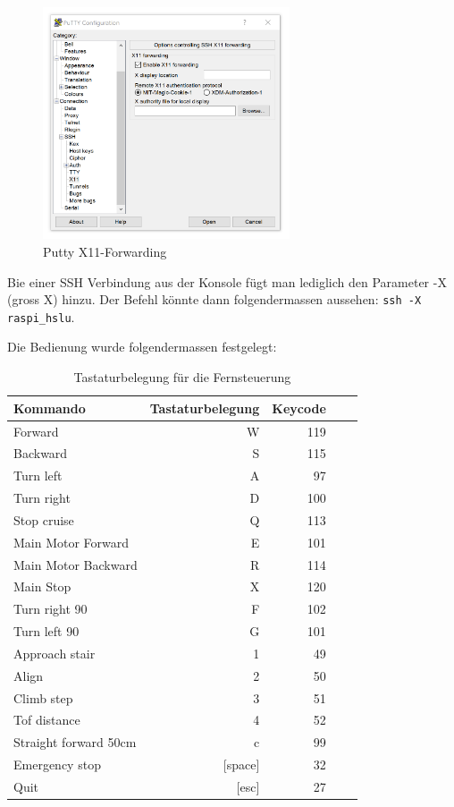 \begin{figure}[H]
  \includegraphics[width=0.65\textwidth]{img/remote_control/putty_x11.PNG}
  \centering
  \caption{Putty X11-Forwarding}
  \label{fig:putty_x11_forwarding}
\end{figure}

Bie einer SSH Verbindung aus der Konsole fügt man lediglich den Parameter -X (gross X) hinzu. Der Befehl könnte dann folgendermassen aussehen: \texttt{ssh -X raspi\_hslu}.

Die Bedienung wurde folgendermassen festgelegt:
\begin{center}
\begin{table}[H]
\begin{tabular}{|l|r|r|r|r|}
\hline
\textbf{Kommando} & \textbf{Tastaturbelegung} &
\textbf{Keycode}\\
\hline
Forward & W & 119\\
\hline
Backward & S & 115\\
\hline
Turn left & A & 97\\
\hline
Turn right & D & 100\\
\hline
Stop cruise & Q & 113\\
\hline
Main Motor Forward & E & 101\\ 
\hline
Main Motor Backward & R & 114\\ 
\hline
Main Stop & X & 120\\ 
\hline
Turn right 90 & F & 102\\ 
\hline
Turn left 90 & G & 101\\ 
\hline
Approach stair & 1 & 49\\ 
\hline
Align & 2 & 50\\ 
\hline
Climb step & 3 & 51\\ 
\hline
Tof distance & 4 & 52\\ 
\hline
Straight forward 50cm & c & 99\\ 
\hline
Emergency stop & [space] & 32\\ 
\hline
Quit & [esc] & 27\\ 
\hline
\end{tabular}
\caption[Tastaturbelegung für die Fernsteuerung]{Tastaturbelegung für die Fernsteuerung}
\label{tab:entwicklungsaufwand}
\end{table}
\end{center}



